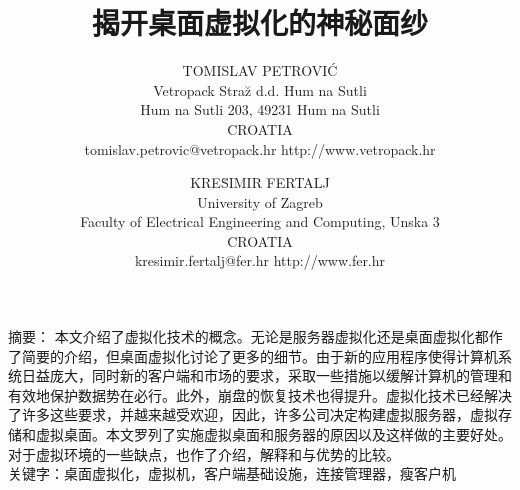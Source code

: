 \documentclass[10pt,a4paper]{article}
\newcommand{\hei}{\CJKfamily{hei}}       						%
\newcommand{\kai}{\CJKfamily{kai}}       						%
\begin{document}
\begin{CJK*}{UTF8}{gkai}
\title{揭开桌面虚拟化的神秘面纱}					   					%
\author{TOMISLAV PETROVI\'{C} 		\\  
        Vetropack Stra\u{z} d.d. Hum na Sutli\\    
        Hum na Sutli 203, 49231 Hum na Sutli \\
        CROATIA \\
		tomislav.petrovic@vetropack.hr http://www.vetropack.hr  \\                                   
  \and                                  %
        KRE\u{S}IMIR FERTALJ \\
        University of Zagreb\\
        Faculty of Electrical Engineering and Computing, Unska 3\\
		CROATIA \\
		kresimir.fertalj@fer.hr http://www.fer.hr\\
		}
\date{}                                             				%
\maketitle                                          				%
\tableofcontents 												%
\clearpage


\newcommand{\cnabstract}
{
本文介绍了虚拟化技术的概念。无论是服务器虚拟化还是桌面虚拟化都作了简要的介绍，但桌面虚拟化讨论了更多的细节。由于新的应用程序使得计算机系统日益庞大，同时新的客户端和市场的要求，采取一些措施以缓解计算机的管理和有效地保护数据势在必行。此外，崩盘的恢复技术也得提升。虚拟化技术已经解决了许多这些要求，并越来越受欢迎，因此，许多公司决定构建虚拟服务器，虚拟存储和虚拟桌面。本文罗列了实施虚拟桌面和服务器的原因以及这样做的主要好处。对于虚拟环境的一些缺点，也作了介绍，解释和与优势的比较。
}
\newcommand{\cnkeywords}{桌面虚拟化，虚拟机，客户端基础设施，连接管理器，瘦客户机}
\begin{center}
\begin{minipage}[c]{12cm}										%
\hei 摘要：\kai \cnabstract\\
\hei 关键字：\kai \cnkeywords\\
\end{minipage}
\end{center}
\clearpage




\end{CJK*}
\end{document}
